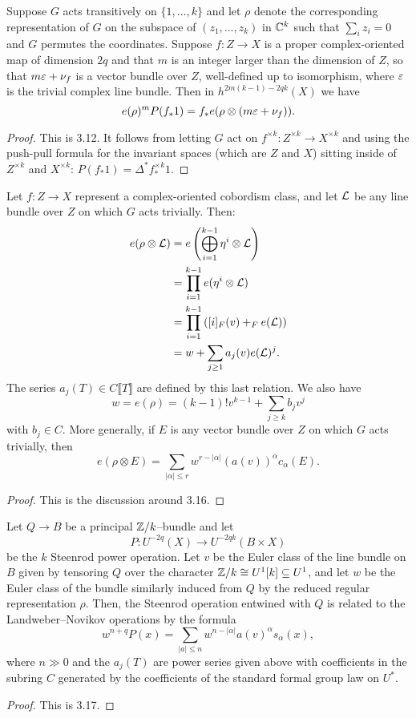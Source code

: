 \begin{theorem}
Suppose $G$ acts transitively on $\{1, \ldots, k\}$ and let $\rho$ denote the corresponding representation of $G$ on the subspace of $(z_1, \ldots, z_k)$ in $\mathbb{C}^k$ such that $\sum_i z_i = 0$ and $G$ permutes the coordinates.  Suppose $f: Z \to X$ is a proper complex-oriented map of dimension $2q$ and that $m$ is an integer larger than the dimension of $Z$, so that $m \varepsilon + \nu_f$ is a vector bundle over $Z$, well-defined up to isomorphism, where $\varepsilon$ is the trivial complex line bundle.  Then in $h^{2m(k-1) - 2qk}(X)$ we have \[e(\rho)^m P(f_* 1) = f_* e(\rho \otimes (m \varepsilon + \nu_f)).\]
\end{theorem}
\begin{proof}
This is 3.12.  It follows from letting $G$ act on $f^{\times k}: Z^{\times k} \to X^{\times k}$ and using the push-pull formula for the invariant spaces (which are $Z$ and $X$) sitting inside of $Z^{\times k}$ and $X^{\times k}$: $P(f_* 1) = \Delta^* f^{\times k}_* 1$.
\end{proof}

\begin{definition}
Let $f: Z \to X$ represent a complex-oriented cobordism class, and let $\mathcal{L}$ be any line bundle over $Z$ on which $G$ acts trivially.  Then:
\begin{align*}
e(\rho \otimes \mathcal{L}) & = e \left( \bigoplus_{i=1}^{k-1} \eta^i \otimes \mathcal{L} \right) \\
& = \prod_{i=1}^{k-1} e(\eta^i \otimes \mathcal{L}) \\
& = \prod_{i=1}^{k-1} \left( [i]_F(v) +_F e(\mathcal{L}) \right) \\
& = w + \sum_{j \ge 1} a_j(v) e(\mathcal{L})^j.
\end{align*}
The series $a_j(T) \in C\llbracket T \rrbracket$ are defined by this last relation.  We also have \[w = e(\rho) = (k-1)! v^{k-1} + \sum_{j \ge k} b_j v^j\] with $b_j \in C$.  More generally, if $E$ is any vector bundle over $Z$ on which $G$ acts trivially, then \[e(\rho \otimes E) = \sum_{|\alpha| \le r} w^{r - |\alpha|} (a(v))^\alpha c_\alpha(E).\]
\end{definition}
\begin{proof}
This is the discussion around 3.16.
\end{proof}

\begin{theorem}
Let $Q \to B$ be a principal $\mathbb Z/k$--bundle and let \[P: U^{-2q}(X) \to U^{-2qk}(B \times X)\] be the $k${\th} Steenrod power operation. Let $v$ be the Euler class of the line bundle on $B$ given by tensoring $Q$ over the character $\mathbb Z/k \cong U^1[k] \subseteq U^1$, and let $w$ be the Euler class of the bundle similarly induced from $Q$ by the reduced regular representation $\rho$.  Then, the Steenrod operation entwined with $Q$ is related to the Landweber--Novikov operations by the formula \[w^{n+q} P(x) = \sum_{|a| \le n} w^{n - |\alpha|} a(v)^\alpha s_\alpha(x),\] where $n \gg 0$ and the $a_j(T)$ are power series given above with coefficients in the subring $C$ generated by the coefficients of the standard formal group law on $U^*$.
\end{theorem}
\begin{proof}
This is 3.17.
\end{proof}

